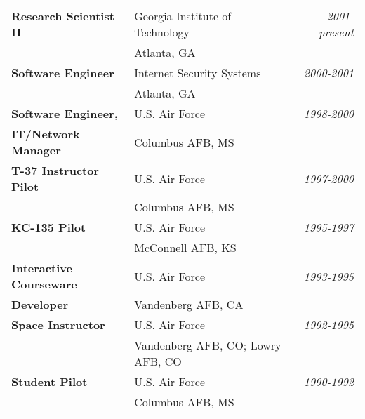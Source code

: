 \documentclass[12pt]{gatech-thesis}
\begin{document}
\begin{postliminary}
\begin{vita}
\begin{tabular}{llr}
\textbf{Research Scientist II} & Georgia Institute of Technology
                               &{\sl 2001-present}\\
                            & Atlanta, GA & \\
\textbf{Software Engineer} & Internet Security Systems & {\sl
  2000-2001}\\
                           & Atlanta, GA & \\
\textbf{Software Engineer,} & U.S. Air Force & {\sl 1998-2000}\\
\textbf{IT/Network Manager} & Columbus AFB, MS & \\
\textbf{T-37 Instructor Pilot} & U.S. Air Force & {\sl 1997-2000}\\
                           & Columbus AFB, MS & \\
\textbf{KC-135 Pilot} & U.S. Air Force & {\sl 1995-1997}\\
                           & McConnell AFB, KS & \\
\textbf{Interactive Courseware} & U.S. Air Force & {\sl 1993-1995}\\
\textbf{Developer} & Vandenberg AFB, CA & \\
\textbf{Space Instructor} & U.S. Air Force & {\sl 1992-1995}\\
                           & Vandenberg AFB, CO; Lowry AFB, CO & \\
\textbf{Student Pilot} & U.S. Air Force & {\sl 1990-1992}\\
                           & Columbus AFB, MS &
\end{tabular}

\end{vita}
\end{postliminary}
\end{document}
